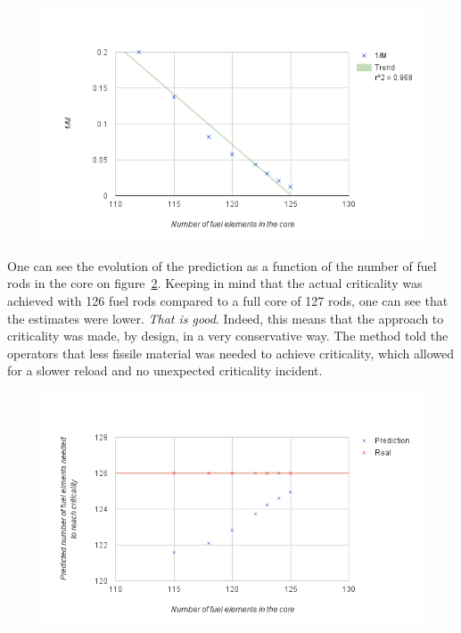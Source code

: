 \begin{figure}[t!]
	\centering
	\includegraphics[height=0.4\textheight]{fig02/1overM.png}
	\label{fig:1overM}
\end{figure}

One can see the evolution of the prediction as a function of the number of fuel rods in the core on figure~\ref{fig:prediction}. Keeping in mind that the actual criticality was achieved with 126 fuel rods compared to a full core of 127 rods, one can see that the estimates were lower. \emph{That is good}. Indeed, this means that the approach to criticality was made, by design, in a very conservative way. The method told the operators that less fissile material was needed to achieve criticality, which allowed for a slower reload and no unexpected criticality incident.


\begin{figure}[t!]
	\centering
	\includegraphics[height=0.4\textheight]{fig02/prediction.png}
	\label{fig:prediction}
\end{figure}
